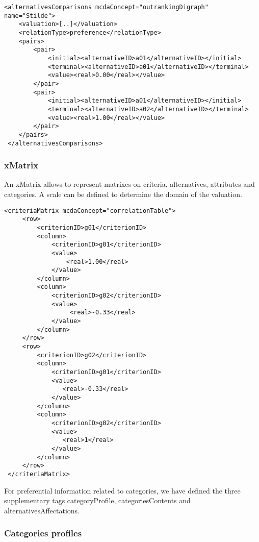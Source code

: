 \documentclass[a4paper,oneside,10 pt]{article}
\newcommand{\code}{\asciifamily}
\begin{document}
{\code
\begin{lstlisting}[style=prototype]
 <alternativesComparisons mcdaConcept="outrankingDigraph" name="Stilde">
	<valuation>[..]</valuation>
	<relationType>preference</relationType>
 	<pairs>
		<pair>
			<initial><alternativeID>a01</alternativeID></initial>
			<terminal><alternativeID>a01</alternativeID></terminal>
			<value><real>0.00</real></value>
		</pair>
		<pair>
			<initial><alternativeID>a01</alternativeID></initial>
			<terminal><alternativeID>a02</alternativeID></terminal>
			<value><real>1.00</real></value>
		</pair>
 	</pairs>
 </alternativesComparisons>
\end{lstlisting}
}

\subsubsection{{\code x}Matrix}

An {\code x}Matrix allows to represent matrixes on criteria, alternatives, attributes and categories. A {\code scale} can be defined to determine the domain of the valuation. 

{\code
\begin{lstlisting}[style=prototype]
 <criteriaMatrix mcdaConcept="correlationTable">
     <row>
         <criterionID>g01</criterionID>
         <column>
             <criterionID>g01</criterionID>
             <value>
                 <real>1.00</real>
             </value>
         </column>
         <column>
             <criterionID>g02</criterionID>
             <value>
                  <real>-0.33</real>
             </value>
         </column>
     </row>
     <row>
         <criterionID>g02</criterionID>
         <column>
             <criterionID>g01</criterionID>
             <value>
                <real>-0.33</real>
             </value>
         </column>
         <column>
             <criterionID>g02</criterionID>
             <value>
                <real>1</real>
             </value>
         </column>
     </row>
 </criteriaMatrix>
\end{lstlisting}
}

For preferential information related to categories, we have defined the three supplementary tags {\code categoryProfile}, {\code categoriesContents} and {\code alternativesAffectations}.

\subsubsection{Categories profiles}
\end{document}
